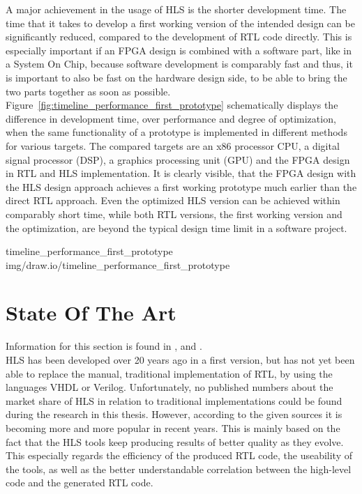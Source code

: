 A major achievement in the usage of HLS is the shorter development time.
The time that it takes to develop a first working version of the intended design can be significantly reduced, compared to the development of RTL code directly.
This is especially important if an FPGA design is combined with a software part, like in a System On Chip, because software development is comparably fast and thus, it is important to also be fast on the hardware design side, to be able to bring the two parts together as soon as possible.\\

Figure~\ref{fig:timeline_performance_first_prototype} schematically displays the difference in development time, over performance and degree of optimization, when the same functionality of a prototype is implemented in different methods for various targets.
The compared targets are an x86 processor CPU, a digital signal processor (DSP), a graphics processing unit (GPU) and the FPGA design in RTL and HLS implementation.
It is clearly visible, that the FPGA design with the HLS design approach achieves a first working prototype much earlier than the direct RTL approach.
Even the optimized HLS version can be achieved within comparably short time, while both RTL versions, the first working version and the optimization, are beyond the typical design time limit in a software project.

 {timeline_performance_first_prototype} {img/draw.io/timeline_performance_first_prototype}


\section{State Of The Art}

Information for this section is found in \cite{EvolutionOfHLS}, \cite{XilinxVivisHLSOpenSource} and \cite{CompareHlsVHDLArticle}.\\

HLS has been developed over 20 years ago in a first version, but has not yet been able to replace the manual, traditional implementation of RTL, by using the languages VHDL or Verilog.
Unfortunately, no published numbers about the market share of HLS in relation to traditional implementations could be found during the research in this thesis.
However, according to the given sources it is becoming more and more popular in recent years.
This is mainly based on the fact that the HLS tools keep producing results of better quality as they evolve.
This especially regards the efficiency of the produced RTL code, the useability of the tools, as well as the better understandable correlation between the high-level code and the generated RTL code.\\

